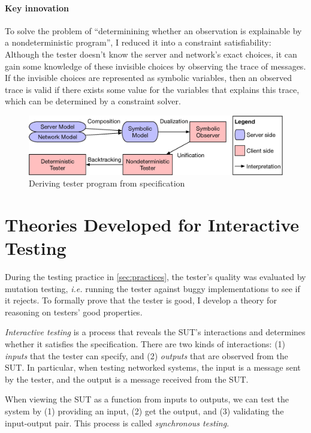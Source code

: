 \documentclass{article}
\theoremstyle{definition}
\begin{document}
\paragraph{Key innovation}
To solve the problem of ``determinining whether an observation is explainable by
a nondeterministic program'', I reduced it into a constraint
satisfiability: Although the tester doesn't know the server and network's exact
choices, it can gain some knowledge of these invisible choices by observing the
trace of messages.  If the invisible choices are represented as symbolic
variables, then an observed trace is valid if there exists some value for the
variables that explains this trace, which can be determined by a constraint
solver.

\begin{figure}
  \includegraphics[width=\linewidth]{figures/framework}
  \caption{Deriving tester program from specification}
  \label{fig:framework}
\end{figure}

\section{Theories Developed for Interactive Testing}
\label{sec:previous-theories}
During the testing practice in \autoref{sec:practices}, the tester's quality was
evaluated by mutation testing, {\it i.e.} running the tester against buggy
implementations to see if it rejects.  To formally prove that the tester is
good, I develop a theory for reasoning on testers' good properties.

{\em Interactive testing} is a process that reveals the SUT's interactions and
determines whether it satisfies the specification.  There are two kinds of
interactions: (1) {\em inputs} that the tester can specify, and (2) {\em
  outputs} that are observed from the SUT.  In particular, when testing
networked systems, the input is a message sent by the tester, and the output is
a message received from the SUT.

When viewing the SUT as a function from inputs to outputs, we can test the
system by (1) providing an input, (2) get the output, and (3) validating the
input-output pair.  This process is called {\em synchronous testing}.
\end{document}
